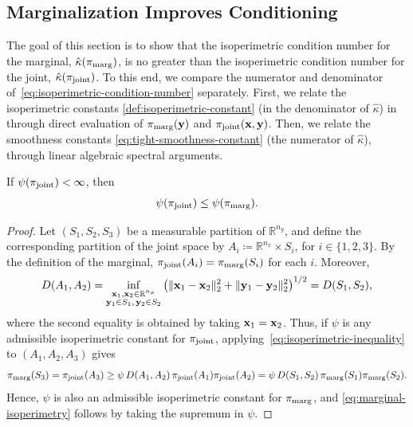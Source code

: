 \documentclass[onefignum,onetabnum]{siamonline250211}
\newcommand{\isocond}{\hat\kappa}
\newcommand{\bfx}{{\bf x}}
\newcommand{\bfy}{{\bf y}}
\newcommand{\bbR}{\mathbb{R}}
\newcommand{\nx}{{n_{x}}}
\newcommand{\ny}{{n_{y}}}
\newcommand{\pjoint}{\pi_{\rm joint}}
\newcommand{\pmarg}{\pi_{\rm marg}}
\begin{document}
%
%
%
%
%
%
%
%
\subsection{Marginalization Improves Conditioning}
\label{sec:marco_vs_joint_conditioning}

The goal of this section is to show that the isoperimetric condition number  for the marginal, $\isocond(\pmarg)$, is no greater than the isoperimetric condition number for the joint, $\isocond(\pjoint)$. 
To this end, we compare the numerator and denominator of~\eqref{eq:isoperimetric-condition-number} separately. 
First, we relate the isoperimetric constants \eqref{def:isoperimetric-constant} (in the denominator of $\isocond$) in  through direct evaluation of $\pmarg(\bfy)$ and $\pjoint(\bfx, \bfy)$. 
Then, we relate the smoothness constants \eqref{eq:tight-smoothness-constant}  (the numerator of $\isocond$), through linear algebraic spectral arguments. 

\begin{proposition}
  \label{prop:marginal-isoperimetry}
  If $\psi(\pjoint) < \infty$, then
  \begin{equation}
    \label{eq:marginal-isoperimetry}
    \psi(\pjoint) \leq \psi(\pmarg).
  \end{equation}
\end{proposition}

\begin{proof}
  Let $(S_1,S_2,S_3)$ be a measurable partition of $\bbR^\ny$, and define the corresponding partition of the joint space by $A_i \coloneqq \bbR^\nx \times S_i$, for $i \in \{1,2,3\}$.
  By the definition of the marginal, $\pjoint(A_i)=\pmarg(S_i)$ for each $i$.
  Moreover,
  \begin{equation*}
    D(A_1,A_2)
    = \inf_{\substack{\bfx_1,\bfx_2\in\bbR^\nx\\ \bfy_1\in S_1,\,\bfy_2\in S_2}}
    \left( \|\bfx_1-\bfx_2\|_2^2 + \|\bfy_1-\bfy_2\|_2^2 \right)^{1 / 2}
    = D(S_1,S_2),
  \end{equation*}
  where %
  the second equality is obtained by taking $\bfx_1=\bfx_2$.
  Thus, if $\psi$ is any admissible isoperimetric constant for $\pjoint$, applying~\eqref{eq:isoperimetric-inequality} to $(A_1,A_2,A_3)$ gives
  \begin{equation*}
    \pmarg(S_3)  = \pjoint(A_3)
    \geq \psi\,D(A_1,A_2)\,\pjoint(A_1)\pjoint(A_2)
    = \psi\,D(S_1,S_2)\,\pmarg(S_1)\pmarg(S_2).
  \end{equation*}
  Hence, $\psi$ is also an admissible isoperimetric constant for $\pmarg$, and
  \eqref{eq:marginal-isoperimetry} follows by taking the supremum in $\psi$.
\end{proof}
\end{document}
